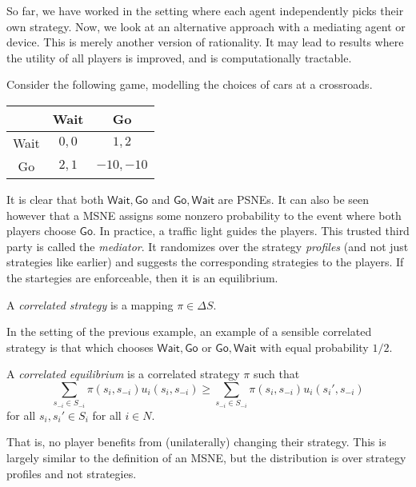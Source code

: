 	So far, we have worked in the setting where each agent independently picks their own strategy. Now, we look at an alternative approach with a mediating agent or device. This is merely another version of rationality. It may lead to results where the utility of all players is improved, and is computationally tractable.

	\begin{fex}
		Consider the following game, modelling the choices of cars at a crossroads.
		\begin{center}
		\begin{tabular}{|c||c|c|}
			\hline & \textsf{Wait} & \textsf{Go} \\ \hline\hline
			\textsf{Wait} & $0,0$ & $1,2$ \\ \hline
			\textsf{Go} & $2,1$ & $-10,-10$ \\ \hline
		\end{tabular}
		\end{center}
		It is clear that both $\mathsf{Wait},\mathsf{Go}$ and $\mathsf{Go},\mathsf{Wait}$ are PSNEs. It can also be seen however that a MSNE assigns some nonzero probability to the event where both players choose $\mathsf{Go}$. In practice, a traffic light guides the players. This trusted third party is called the \emph{mediator}. It randomizes over the strategy \emph{profiles} (and not just strategies like earlier) and suggests the corresponding strategies to the players. If the startegies are enforceable, then it is an equilibrium. 
	\end{fex}

	\begin{fdef}
		A \emph{correlated strategy} is a mapping $\pi \in \Delta S$.
	\end{fdef}

	In the setting of the previous example, an example of a sensible correlated strategy is that which chooses $\mathsf{Wait},\mathsf{Go}$ or $\mathsf{Go},\mathsf{Wait}$ with equal probability $1/2$.

	\begin{fdef}
		A \emph{correlated equilibrium} is a correlated strategy $\pi$ such that
		\[ \sum_{s_{-i} \in S_{-i}} \pi(s_i,s_{-i}) u_i(s_i,s_{-i}) \ge \sum_{s_{-i} \in S_{-i}} \pi(s_i,s_{-i}) u_i(s_i',s_{-i}) \]
		for all $s_i,s_i' \in S_i$ for all $i \in N$.
	\end{fdef}
	That is, no player benefits from (unilaterally) changing their strategy. This is largely similar to the definition of an MSNE, but the distribution is over strategy profiles and not strategies.\\

